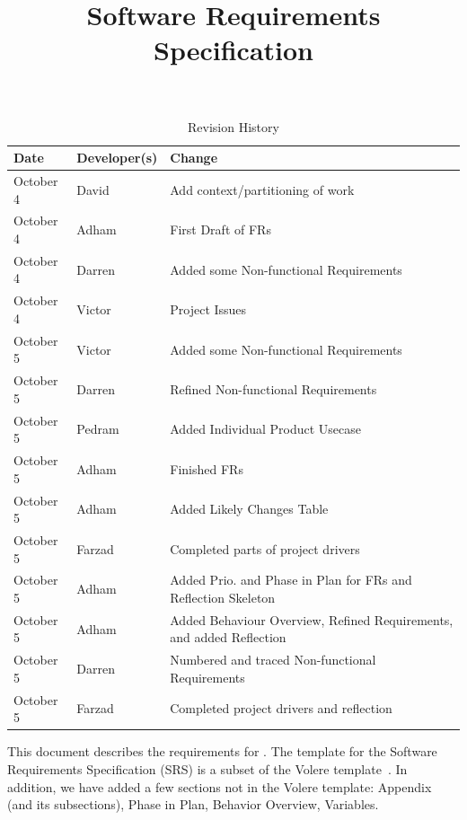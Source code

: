 \documentclass[12pt]{article}
\title{Software Requirements Specification\\\progname}
\author{\authname}
\date{}
\begin{document}
\maketitle

\newpage
{}

\tableofcontents

\newpage

\begin{table}[hp]
\caption{Revision History} \label{TblRevisionHistory}
\begin{tabularx}{\textwidth}{llX}
\toprule
\textbf{Date} & \textbf{Developer(s)} & \textbf{Change}\\
\midrule
October 4 & David & Add context/partitioning of work\\
\midrule
October 4 & Adham & First Draft of FRs\\
\midrule
October 4 & Darren & Added some Non-functional Requirements\\
\midrule
October 4 & Victor & Project Issues\\
\midrule
October 5 & Victor & Added some Non-functional Requirements\\
\midrule
October 5 & Darren & Refined Non-functional Requirements\\
\midrule
October 5 & Pedram & Added Individual Product Usecase\\
\midrule
October 5 & Adham & Finished FRs\\
\midrule
October 5 & Adham & Added Likely Changes Table\\
\midrule
October 5 & Farzad & Completed parts of project drivers\\
\midrule
October 5 & Adham & Added Prio. and Phase in Plan for FRs and Reflection Skeleton\\
\midrule
October 5 & Adham & Added Behaviour Overview, Refined Requirements, and added Reflection\\
\midrule
October 5 & Darren & Numbered and traced Non-functional Requirements\\
\midrule
October 5 & Farzad & Completed project drivers and reflection\\
\bottomrule
\end{tabularx}
\end{table}

\newpage

\listoftables
\listoffigures

\newpage


This document describes the requirements for \progname. The template for the Software
Requirements Specification (SRS) is a subset of the Volere
template~\cite{RobertsonAndRobertson2012}. In addition, we have added a few sections not
in the Volere template: Appendix (and its subsections), Phase in Plan, Behavior Overview, Variables.
\end{document}
